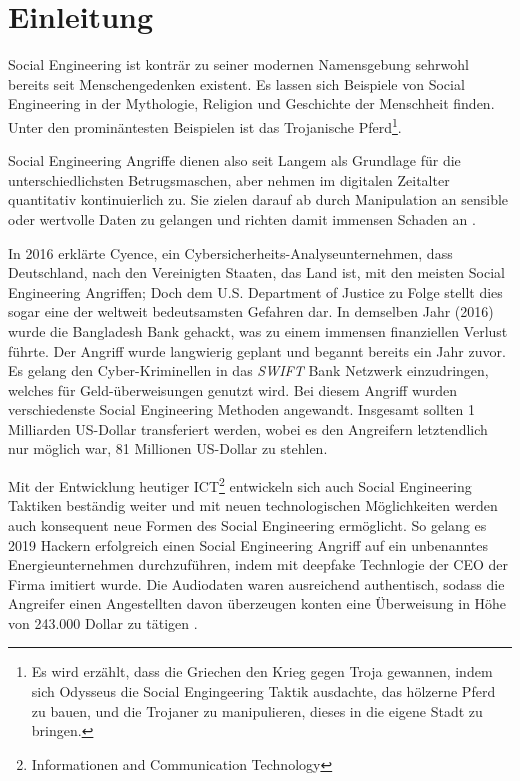\chapter{Einleitung}
\label{chapter:einleitung}

Social Engineering ist konträr zu seiner modernen Namensgebung sehrwohl bereits seit
Menschengedenken existent. Es lassen sich Beispiele von Social Engineering in der Mythologie,
Religion und Geschichte der Menschheit finden.
Unter den prominäntesten Beispielen ist das Trojanische Pferd\footnote{Es wird erzählt, dass
die Griechen den Krieg gegen Troja gewannen,
indem sich Odysseus die Social Engingeering Taktik ausdachte, das hölzerne Pferd zu bauen,
und die Trojaner zu manipulieren, dieses in die eigene Stadt zu bringen.}.

Social Engineering Angriffe dienen also seit Langem als Grundlage für die unterschiedlichsten Betrugsmaschen,
aber nehmen im digitalen Zeitalter quantitativ kontinuierlich zu.
Sie zielen darauf ab durch Manipulation an sensible oder wertvolle Daten zu gelangen
und richten damit immensen Schaden an .

In 2016 erklärte Cyence, ein Cybersicherheits-Analyseunternehmen, dass Deutschland, nach den Vereinigten Staaten,
das Land ist, mit den meisten Social Engineering Angriffen; Doch dem U.S. Department of Justice zu Folge stellt
dies sogar eine der weltweit bedeutsamsten Gefahren dar.
In demselben Jahr (2016) wurde die Bangladesh Bank gehackt, was zu einem immensen finanziellen Verlust führte.
Der Angriff wurde langwierig geplant und begannt bereits ein Jahr zuvor.
Es gelang den Cyber-Kriminellen in das \textit{SWIFT} Bank Netzwerk einzudringen, welches für Geld-überweisungen
genutzt wird. Bei diesem Angriff wurden verschiedenste Social Engineering Methoden angewandt.
Insgesamt sollten 1 Milliarden US-Dollar transferiert werden, wobei es den Angreifern
letztendlich nur möglich war, 81 Millionen US-Dollar zu stehlen.

Mit der Entwicklung heutiger ICT\footnote{Informationen and Communication Technology} entwickeln sich auch
Social Engineering Taktiken beständig weiter und mit neuen technologischen Möglichkeiten werden auch
konsequent neue Formen des Social Engineering ermöglicht.
So gelang es 2019 Hackern erfolgreich einen Social Engineering Angriff auf ein unbenanntes Energieunternehmen
durchzuführen, indem mit deepfake Technlogie der CEO der Firma imitiert wurde. Die Audiodaten waren ausreichend
authentisch, sodass die Angreifer einen Angestellten davon überzeugen konten eine Überweisung in Höhe von
243.000 Dollar zu tätigen .

